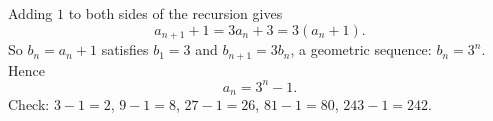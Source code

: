 Adding $1$ to both sides of the recursion gives
\[
a_{n+1}+1=3a_n+3=3(a_n+1).
\]
So $b_n=a_n+1$ satisfies $b_1=3$ and $b_{n+1}=3b_n$, a geometric sequence: $b_n=3^n$. Hence
\[
\boxed{a_n=3^n-1}.
\]
Check: $3-1=2$, $9-1=8$, $27-1=26$, $81-1=80$, $243-1=242$.
